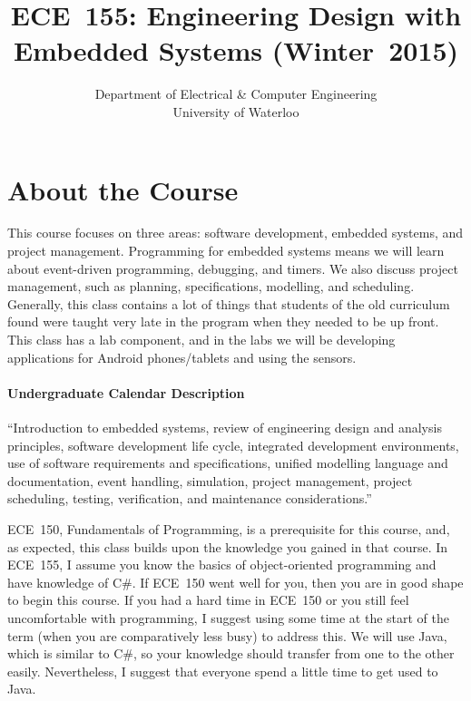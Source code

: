 \documentclass[letterpaper,10pt]{article}
\date{}
\title{\bf\LARGE ECE~155: Engineering Design with Embedded Systems (Winter~2015)}
\author{Department of Electrical \& Computer Engineering \\
                University of Waterloo}
\begin{document}
\maketitle
\vspace{-0.5in}

\section*{About the Course}

This course focuses on three areas: software development, embedded systems, and project management. Programming for embedded systems means we will learn about event-driven programming, debugging, and timers. We also discuss project management, such as planning, specifications, modelling, and scheduling. Generally, this class contains a lot of things that students of the old curriculum found were taught very late in the program when they needed to be up front. This class has a lab component, and in the labs we will be developing applications for Android phones/tablets and using the sensors.

\paragraph{Undergraduate Calendar Description} ``Introduction to embedded systems, review of engineering design and analysis principles, software development life cycle, integrated development environments, use of software requirements and specifications, unified modelling language and documentation, event handling, simulation, project management, project scheduling, testing, verification, and maintenance considerations.''

ECE~150, Fundamentals of Programming, is a prerequisite for this course, and, as expected, this class builds upon the knowledge you gained in that course. In ECE~155, I assume you know the basics of object-oriented programming and have knowledge of C\#. If ECE~150 went well for you, then you are in good shape to begin this course. If you had a hard time in ECE~150 or you still feel uncomfortable with programming, I suggest using some time at the start of the term (when you are comparatively less busy) to address this. We will use Java, which is similar to C\#, so your knowledge should transfer from one to the other easily. Nevertheless, I suggest that everyone spend a little time to get used to Java.
\end{document}
